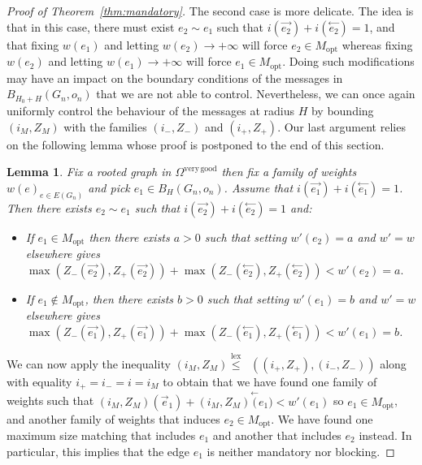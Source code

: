 \documentclass[11pt]{article}
\DeclareMathOperator{\lex}{lex}
\DeclareMathOperator*{\maxlex}{\overset{\lex}{\max}}
\newtheorem{lemma}[prop]{Lemma}
\begin{document}
\begin{proof}[Proof of Theorem~\ref{thm:mandatory}]
     The second case is more delicate. The idea is that in this case, there must exist $e_2 \sim e_1$ such that $i(\overset{\rightarrow}{e_2})+i(\overset{\leftarrow}{e_2})=1$, and that fixing $w(e_1)$ and letting $w(e_2)\rightarrow +\infty$ will force $e_2 \in M_{\mathrm{opt}}$ whereas fixing $w(e_2)$ and letting $w(e_1) \rightarrow +\infty$ will force $e_1 \in M_{\mathrm{opt}}$. Doing such modifications may have an impact on the boundary conditions of the messages in $B_{H_0+H}(G_n,o_n)$ that we are not able to control. Nevertheless, we can once again uniformly control the behaviour of the messages at radius $H$ by bounding $(i_M,Z_M)$  with the families $(i_-,Z_-)$ and $(i_+,Z_+)$. Our last argument relies on the following lemma whose proof is postponed to the end of this section.
     \begin{lemma}\label{lem:chirurgieloc}
         Fix a rooted graph in $\Omega^{\mathrm{very\, good}}$ then fix a family of weights $w(e)_{e \in E(G_n)}$ and pick $e_1 \in B_H(G_n,o_n)$.
         Assume that $i(\overset{\rightarrow}{e_1})+i(\overset{\leftarrow}{e_1})=1$.
         Then there exists $e_2 \sim e_1$ such that $i(\overset{\rightarrow}{e_2})+i(\overset{\leftarrow}{e_2})=1$ and:
         \begin{itemize}
             \item If $e_1\in M_{\mathrm{opt}}$ then there exists $a>0$ such that setting $w'(e_2)=a$ and $w'=w$ elsewhere gives $\max(Z_-(\overset{\rightarrow}{e_2}),Z_+(\overset{\rightarrow}{e_2}))+\max(Z_-(\overset{\leftarrow}{e_2}),Z_+(\overset{\leftarrow}{e_2}))<w'(e_2)=a.$
             \item If $e_1 \notin M_{\mathrm{opt}}$, then there exists $b>0$ such that setting $w'(e_1)=b$ and $w'=w$ elsewhere gives $\max(Z_-(\overset{\rightarrow}{e_1}),Z_+(\overset{\rightarrow}{e_1}))+\max(Z_-(\overset{\leftarrow}{e_1}),Z_+(\overset{\leftarrow}{e_1}))<w'(e_1)=b$.
         \end{itemize}
     \end{lemma}
 
     We can now apply the inequality $(i_M,Z_M)\overset{\lex}{\leq} \maxlex((i_+,Z_+),(i_-,Z_-))$ along with equality $i_+=i_-=i=i_M$ to obtain that we have found one family of weights such that $(i_M,Z_M)(\overset{\rightarrow}{e}_1)+ (i_M,Z_M)\overset{\leftarrow}({e_1})<w'(e_1)$ so $e_1 \in M_{\mathrm{opt}}$, and another family of weights that induces  $e_2 \in M_{\mathrm{opt}}$. We have found one maximum size matching that includes $e_1$ and another that includes $e_2$ instead. In particular, this implies that the edge $e_1$ is neither mandatory nor blocking.
\end{proof}
\end{document}
